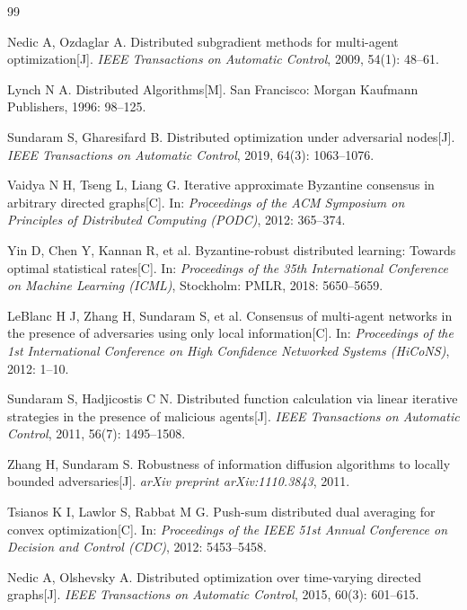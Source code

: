 \documentclass[12pt,hyperref,a4paper,UTF8]{ctexart}
\numberwithin{equation}{section}
\numberwithin{figure}{section}
\numberwithin{table}{section}
\begin{document}
\newpage

\begin{thebibliography}{99}

Nedic A, Ozdaglar A. Distributed subgradient methods for multi-agent optimization[J].
\textit{IEEE Transactions on Automatic Control}, 2009, 54(1): 48--61.

Lynch N A. Distributed Algorithms[M]. San Francisco: Morgan Kaufmann Publishers, 1996: 98--125.

Sundaram S, Gharesifard B. Distributed optimization under adversarial nodes[J].
\textit{IEEE Transactions on Automatic Control}, 2019, 64(3): 1063--1076.

Vaidya N H, Tseng L, Liang G. Iterative approximate Byzantine consensus in arbitrary directed graphs[C].
In: \textit{Proceedings of the ACM Symposium on Principles of Distributed Computing (PODC)}, 2012: 365--374.

Yin D, Chen Y, Kannan R, et al. Byzantine-robust distributed learning: Towards optimal statistical rates[C].
In: \textit{Proceedings of the 35th International Conference on Machine Learning (ICML)}, Stockholm: PMLR, 2018: 5650--5659.

LeBlanc H J, Zhang H, Sundaram S, et al. Consensus of multi-agent networks in the presence of adversaries using only local information[C].
In: \textit{Proceedings of the 1st International Conference on High Confidence Networked Systems (HiCoNS)}, 2012: 1--10.

Sundaram S, Hadjicostis C N. Distributed function calculation via linear iterative strategies in the presence of malicious agents[J].
\textit{IEEE Transactions on Automatic Control}, 2011, 56(7): 1495--1508.

Zhang H, Sundaram S. Robustness of information diffusion algorithms to locally bounded adversaries[J].
\textit{arXiv preprint arXiv:1110.3843}, 2011.

Tsianos K I, Lawlor S, Rabbat M G. Push-sum distributed dual averaging for convex optimization[C].
In: \textit{Proceedings of the IEEE 51st Annual Conference on Decision and Control (CDC)}, 2012: 5453--5458.

Nedic A, Olshevsky A. Distributed optimization over time-varying directed graphs[J].
\textit{IEEE Transactions on Automatic Control}, 2015, 60(3): 601--615.


\end{thebibliography}
\end{document}

